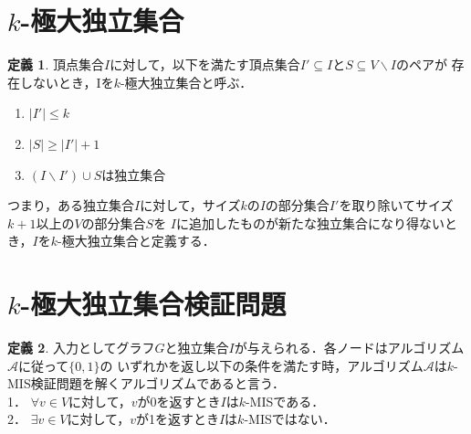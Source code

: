 \documentclass[12pt]{thesis}
\theoremstyle{definition}
\newtheorem{definition}{定義}[chapter]
\begin{document}
\section{$k$-極大独立集合}

\begin{definition}
頂点集合$I$に対して，以下を満たす頂点集合$I' \subseteq I$と$S\subseteq V \backslash I$のペアが
存在しないとき，Iを$k$-極大独立集合と呼ぶ．
\begin{enumerate}
\item $|I'| \leq k$
\item $|S| \geq |I'| + 1$
\item $(I \backslash I') \cup S$は独立集合
\end{enumerate}
\end{definition}
つまり，ある独立集合$I$に対して，サイズ$k$の$I$の部分集合$I'$を取り除いてサイズ$k + 1$以上の$V$の部分集合$S$を
$I$に追加したものが新たな独立集合になり得ないとき，$I$を$k$-極大独立集合と定義する．

\section{$k$-極大独立集合検証問題}
\begin{definition}
入力としてグラフ$G$と独立集合$I$が与えられる．各ノードはアルゴリズム$\mathcal{A}$に従って$\{0,1\}$の
いずれかを返し以下の条件を満たす時，アルゴリズム$\mathcal{A}$は$k$-MIS検証問題を解くアルゴリズムであると言う．\\
1． $\forall v\in V$に対して，$v$が0を返すとき$I$は$k$-MISである．\\
2． $\exists v \in V$に対して，$v$が1を返すとき$I$は$k$-MISではない．
\end{definition}
\newpage
\end{document}

